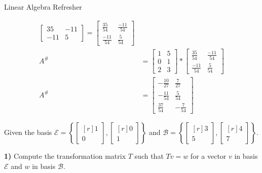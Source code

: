 \documentclass[
	english,
        solution=true
	]{tudaexercise}
\begin{document}
\begin{task}[points=28]{Linear Algebra Refresher}
\begin{subtask}[points=3,title=Matrix Pseudoinverse applied]
\begin{solution}
\begin{align*}
\begin{bmatrix}
        35 & -11 \\ -11 & 5
    \end{bmatrix}=\begin{bmatrix}
        \frac{35}{54} & \frac{-11}{54} \\[0.5em] \frac{-11}{54}  & \frac{5}{54}
    \end{bmatrix}\\
    A^\# &= \begin{bmatrix}
        1 & 5 \\ 0 & 1 \\ 2 & 3
    \end{bmatrix}*\begin{bmatrix}
        \frac{35}{54} & \frac{-11}{54} \\[0.5em] \frac{-11}{54}  & \frac{5}{54}
    \end{bmatrix}\\
    A^\# &=\begin{bmatrix}
        -\frac{10}{27} & \frac{7}{27} \\[0.5em] -\frac{11}{54} & \frac{5}{54} \\[0.5em] \frac{37}{54} & -\frac{7}{54}
    \end{bmatrix}
\end{align*}

\end{solution}
\end{subtask}


\begin{subtask}[points=5,title=Basis Transformation ]

Given the basis $\mathcal{E} = \left\{\begin{bmatrix*}[r] 1 \\ 0\end{bmatrix*},
\begin{bmatrix*}[r] 0 \\ 1\end{bmatrix*}\right\}$ and
$\mathcal{B} = \left\{\begin{bmatrix*}[r] 3 \\ 5\end{bmatrix*},
\begin{bmatrix*}[r] 4 \\ 7\end{bmatrix*}\right\}$.

\textbf{1)} Compute the transformation matrix $T$ such that $Tv=w$ for a vector $v$ in basis $\mathcal{E}$ and $w$ in basis $\mathcal{B}$.


\end{subtask}
\end{task}
\end{document}
